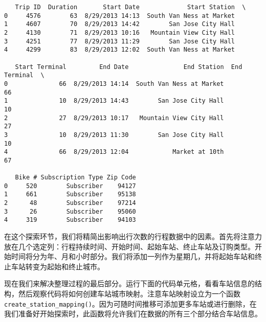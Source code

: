 \documentclass[11pt]{article}
\begin{document}
    
    \begin{verbatim}
   Trip ID  Duration       Start Date             Start Station  \
0     4576        63  8/29/2013 14:13  South Van Ness at Market   
1     4607        70  8/29/2013 14:42        San Jose City Hall   
2     4130        71  8/29/2013 10:16   Mountain View City Hall   
3     4251        77  8/29/2013 11:29        San Jose City Hall   
4     4299        83  8/29/2013 12:02  South Van Ness at Market   

   Start Terminal         End Date               End Station  End Terminal  \
0              66  8/29/2013 14:14  South Van Ness at Market            66   
1              10  8/29/2013 14:43        San Jose City Hall            10   
2              27  8/29/2013 10:17   Mountain View City Hall            27   
3              10  8/29/2013 11:30        San Jose City Hall            10   
4              66  8/29/2013 12:04            Market at 10th            67   

   Bike # Subscription Type Zip Code  
0     520        Subscriber    94127  
1     661        Subscriber    95138  
2      48        Subscriber    97214  
3      26        Subscriber    95060  
4     319        Subscriber    94103  
    \end{verbatim}

    
    在这个探索环节，我们将精简出影响出行次数的行程数据中的因素。首先将注意力放在几个选定列：行程持续时间、开始时间、起始车站、终止车站及订购类型。开始时间将分为年、月和小时部分。我们将添加一列作为星期几，并将起始车站和终止车站转变为起始和终止城市。

现在我们来解决整理过程的最后部分。运行下面的代码单元格，看看车站信息的结构，然后观察代码将如何创建车站城市映射。注意车站映射设立为一个函数
\texttt{create\_station\_mapping()}。因为可随时间推移可添加更多车站或进行删除，在我们准备好开始探索时，此函数将允许我们在数据的所有三个部分结合车站信息。
\end{document}
